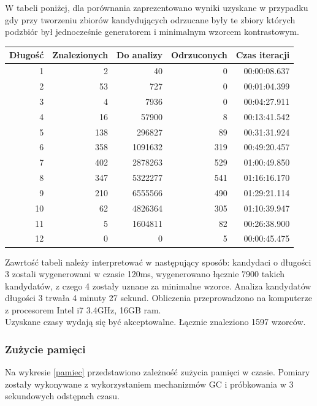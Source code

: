 \documentclass[a4paper,12pt]{article}
\begin{document}
W tabeli poniżej, dla porównania zaprezentowano wyniki uzyskane w przypadku gdy przy tworzeniu zbiorów kandydujących odrzucane były te zbiory których podzbiór był jednocześnie generatorem i minimalnym wzorcem kontrastowym.

\vspace{0.5cm}

\begin{tabular}{|r|r|r|r|r|}
\hline
Długość & Znalezionych & Do analizy & Odrzuconych & Czas iteracji\\ \hline
1 & 2 & 40 & 0 &  00:00:08.637 \\ \hline 
2 & 53 & 727 & 0 & 00:01:04.399 \\ \hline
3 & 4 & 7936 & 0 & 00:04:27.911 \\ \hline
4 & 16 & 57900 & 8 & 00:13:41.542 \\ \hline
5 & 138 & 296827 & 89 & 00:31:31.924 \\ \hline
6 & 358 & 1091632 & 319 & 00:49:20.457 \\ \hline
7 & 402 & 2878263 & 529 & 01:00:49.850 \\ \hline
8 & 347 & 5322277 & 541 & 01:16:16.170 \\ \hline
9 & 210 & 6555566 & 490 & 01:29:21.114 \\ \hline
10 & 62 & 4826364 & 305 & 01:10:39.947 \\ \hline
11 & 5 & 1604811 & 82 & 00:26:38.900 \\ \hline
12 & 0 & 0 & 5 & 00:00:45.475 \\ \hline
\end{tabular}

\vspace{0.5cm}

Zawrtość tabeli należy interpretować w następujący sposób: kandydaci o długości 3 zostali wygenerowani w czasie 120ms, wygenerowano łącznie 7900 takich kandydatów, z czego 4 zostały uznane za minimalne wzorce. Analiza kandydatów długości 3 trwała 4 minuty 27 sekund. Obliczenia przeprowadzono na komputerze z procesorem Intel i7 3.4GHz, 16GB ram.\\

Uzyskane czasy wydają się być akceptowalne. Łącznie znaleziono 1597 wzorców.\\

\subsubsection{Zużycie pamięci}

Na wykresie \ref{pamiec} przedstawiono zależność zużycia pamięci w czasie. Pomiary zostały wykonywane z wykorzystaniem mechanizmów GC i próbkowania w 3 sekundowych odstępach czasu.
\end{document}
